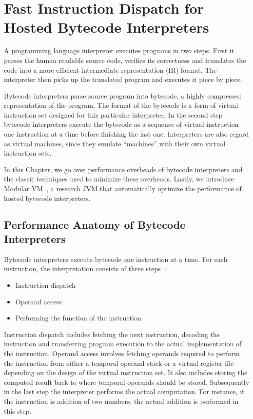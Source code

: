 \chapter{Fast Instruction Dispatch for Hosted Bytecode Interpreters}
\label{chp:ch3-bytecode}

A programming language interpreter executes programs in two steps.
First it parses the human readable source code, verifies its correctness and translates the code into a more efficient intermediate representation (IR) format.
The interpreter then picks up the translated program and executes it piece by piece.

Bytecode interpreters parse source program into bytecode, a highly compressed representation of the program.
The format of the bytecode is a form of virtual instruction set designed for this particular interpreter.
In the second step bytecode interpreters execute the bytecode as a sequence of virtual instruction one instruction at a time before finishing the last one.
Interpreters are also regard as virtual machines, since they emulate ``machines'' with their own virtual instruction sets.

In this Chapter, we go over performance overheads of bytecode interpreters and the classic techniques used to minimize these overheads.
Lastly, we introduce Modular VM~\cite{savrun2013, savrun2014}, a research JVM that automatically optimize the performance of hosted bytecode interpreters.

\section{Performance Anatomy of Bytecode Interpreters}

Bytecode interpreters execute bytecode one instruction at a time.
For each instruction, the interpretation consists of three steps~\cite{davis2003case}:
\begin{itemize}
  \item Instruction dispatch
  \item Operand access
  \item Performing the function of the instruction
\end{itemize}
Instruction dispatch includes fetching the next instruction, decoding the instruction and transferring program execution to the actual implementation of the instruction.
Operand access involves fetching operands required to perform the instruction from either a temporal operand stack or a virtual register file depending on the design of the virtual instruction set.
It also includes storing the computed result back to where temporal operands should be stored.
Subsequently in the last step the interpreter performs the actual computation.
For instance, if the instruction is addition of two numbers, the actual addition is performed in this step.

